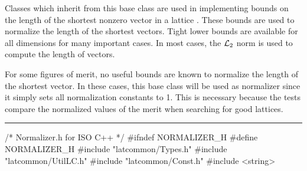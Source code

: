 % 
% 
% 
% 


Classes which inherit from this base class are used in implementing bounds
on the length of the shortest nonzero vector in a lattice \cite{mCON99a}.
These bounds are used to normalize the length of the shortest vectors. 
Tight lower bounds are available for all dimensions for many important cases.
In most cases, the ${\cal L}_2$ norm is used to compute the length of vectors.

For some figures of merit, no useful bounds are known to normalize the length
of the shortest vector. In these cases, this base class will be used as 
normalizer since it simply sets all normalization constants to 1. This is
necessary because the tests compare the normalized values of the merit 
when searching for good lattices.



\bigskip\hrule
\code\hide
/* Normalizer.h for ISO C++ */
#ifndef NORMALIZER_H
#define NORMALIZER_H
\endhide 
#include "latcommon/Types.h"
#include "latcommon/UtilLC.h"
#include "latcommon/Const.h"
#include <string>


